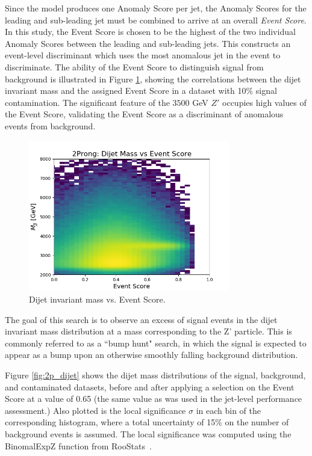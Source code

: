 \documentclass[12pt, a4paper]{article}
\begin{document}
Since the model produces one Anomaly Score per jet, the Anomaly Scores for the leading and sub-leading jet must be combined to arrive at an overall \textit{Event Score}. In this study, the Event Score is chosen to be the highest of the two individual Anomaly Scores between the leading and sub-leading jets. This constructs an event-level discriminant which uses the most anomalous jet in the event to discriminate. The ability of the Event Score to distinguish signal from background is illustrated in Figure \ref{fig:mjj_vs_evscore}, showing the correlations between the dijet invariant mass and the assigned Event Score in a dataset with 10\% signal contamination. The significant feature of the $3500$ GeV $Z'$ occupies high values of the Event Score, validating the Event Score as a discriminant of anomalous events from background.

\begin{figure}[H]
	\begin{center}
		\includegraphics[width=250pt]{imgs/bugfix/ProcR_2Prong_Contaminated_10p0_2Prong_Contaminated_10p0_Weights_Event_ConstOnly_Avg_JJ_M_vs_Event_Score_SaveForPaper_Lead.png}
	\end{center}
	\caption{Dijet invariant mass vs. Event Score.}
	\label{fig:mjj_vs_evscore}
\end{figure}

The goal of this search is to observe an excess of signal events in the dijet invariant mass distribution at a mass corresponding to the Z' particle. 
This is commonly referred to as a ``bump hunt" search, in which the signal is expected to appear as a bump upon an otherwise smoothly falling background distribution. 

Figure \ref{fig:2p_dijet} shows the dijet mass distributions of the signal, background, and contaminated datasets, before and after applying a selection on the Event Score at a value of 0.65 (the same value as was used in the jet-level performance assessment.) Also plotted is the local significance $\sigma$ in each bin of the corresponding histogram, where a total uncertainty of 15\% on the number of background events is assumed. The local significance was computed using the {\sc BinomalExpZ} function from {\sc RooStats}~\cite{moneta2011roostats}. 
\end{document}
